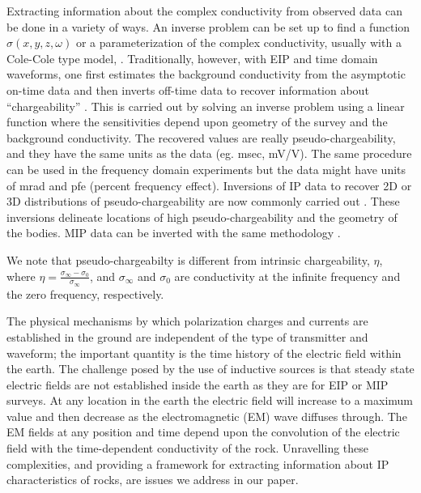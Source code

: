 \documentclass[extra,mreferee]{gji}
\newcommand{\siginf}{\sigma_\infty}
\begin{document}
Extracting information about the complex conductivity from observed data can be done in a variety of ways. An inverse problem can be set up to find a function $\sigma(x,y,z,\omega)$ or a parameterization of the complex conductivity, usually with a Cole-Cole type model, \cite[]{Fiandaca2012, Marchant2013,Xu2013}. Traditionally, however, with EIP and time domain waveforms, one first estimates the background conductivity from the asymptotic on-time data and then inverts off-time data to recover information about ``chargeability'' \cite[]{doug1994}. This is carried out by solving an inverse problem using a linear function where the sensitivities depend upon geometry of the survey and the background conductivity. The recovered values are really pseudo-chargeability, and they have the same units as the data (eg. msec, mV/V). The same procedure can be used in the frequency domain experiments but the data might have units of mrad and pfe (percent frequency effect). Inversions of IP data to recover 2D or 3D distributions of pseudo-chargeability are now commonly carried out \cite[]{Kemna2012}. These inversions delineate locations of high pseudo-chargeability and the geometry of the bodies. MIP data can be inverted with the same methodology \cite[]{Chen2003}. 


We note that pseudo-chargeabilty is different from intrinsic chargeability, $\eta$, where $\eta = \frac{\siginf-\sigma_0}{\siginf}$, and $\siginf$ and $\sigma_0$ are conductivity at the infinite frequency and the zero frequency, respectively. 






The physical mechanisms by which polarization charges and currents are established in the ground are independent of the type of transmitter and waveform; the important quantity is the time history of the electric field within the earth. The challenge posed by the use of inductive sources is that steady state electric fields are not established inside the earth as they are for EIP or MIP surveys. At any location in the earth the electric field will increase to a maximum value and then decrease as the electromagnetic (EM) wave diffuses through. The EM fields at any position and time depend upon the convolution of the electric field with the time-dependent conductivity of the rock. Unravelling these complexities, and providing a framework for extracting information about IP characteristics of rocks, are issues we address in our paper. 
\end{document}
